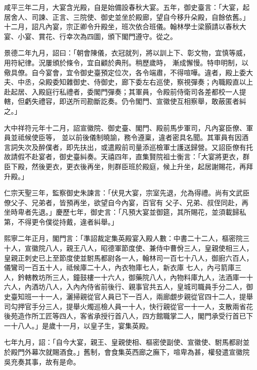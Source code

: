\begin{pinyinscope}
 咸平三年二月，大宴含光殿，自是始備設春秋大宴。五年，御史臺言：「大宴，起居舍人、司諫、正言、三院使、御史並坐於殿廊，望自今移升朵殿，自餘依舊。」十二月，詔凡內宴，宗正卿令升殿坐，班次依合班儀。翰林學士梁顥請以春秋大宴、小宴、賞花、行幸次為四圖，頒下閣門遵守。從之。



 景德二年九月，詔曰：「朝會陳儀，衣冠就列，將以訓上下、彰文物，宜慎等威，用符紀律。況屢頒於條令，宜自顧於典刑。稍歷歲時，
 漸成懈慢。特申明制，以儆具僚。自今宴會，宜令御史臺預定位次，各令端肅，不得喧嘩。違者，殿上委大夫、中丞，朵殿委知雜御史、侍御史，廊下委左右巡使，察視彈奏；內職殿直以上赴起居、入殿庭行私禮者，委閣門彈奏；其軍員，令殿前侍衛司各差都校一人提轄，但虧失禮容，即送所司勘斷訖奏。仍令閣門、宣徽使互相察舉，敢蔽匿者糾之。」



 大中祥符元年十二月，詔宣徽院、御史臺、閣門、殿前馬步軍司，凡內宴臣僚、軍員並祗候使臣等，
 並以前後儀制曉諭，務令遵稟，違者密具名聞。其軍員有因酒言詞失次及醉僕者，即先扶出，或遣殿前司量添巡檢軍士護送歸營。又詔臣僚有托故請假不赴宴者，御史臺糾奏。天禧四年，直集賢院祖士衡言：「大宴將更衣，群臣下殿，然後更衣，更衣後再坐，則群臣班於殿庭，候上升坐，起居謝賜花，再拜升殿。」



 仁宗天聖三年，監察御史朱諫言：「伏見大宴，宗室先退，允為得禮。尚有文武臣僚父子、兄弟者，皆預再坐，欲望自今內宴，百官有
 父子、兄弟、叔侄同赴，再坐時卑者先退。」慶歷七年，御史言：「凡預大宴並御筵，其所賜花，並須載歸私第，不得更令僕從持戴，違者糾舉。」



 熙寧二年正月，閣門言：「準詔裁定集英殿宴入殿人數：中書二十二人，樞密院三十人，宣徽院八人，親王八人，昭德軍節度使、兼侍中曹佾三人，皇親使相三人，皇親正刺史已上至節度使並駙馬都尉各一人，翰林司一百七十八人，御廚六百人，儀鸞司一百五十人，祗候庫二十人，內衣物庫七人，新衣庫
 七人，內弓箭庫三人，鈐轄教坊所三人，鐘鼓樓一十六人，御藥院八人，內物料庫九人，法酒庫一十六人，內酒坊八人，入內內侍省前後行、親事官共五人，皇城司職員手分二人，御史臺知班一十一人，灑掃親從官人員已下一百人，兩廊覷步親從官四十二人，提舉司勾押官手分三人，提舉火燭巡檢人員一十人，快行親從官一十一人，支散兩省花後苑造作所工匠等四人，客省承授行首八人，四方館職掌二人，閣門承受行首已下
 一十八人。」是歲十一月，以皇子生，宴集英殿。



 七年九月，詔：「自今大宴，親王、皇親使相、樞密使副使、宣徽使、駙馬都尉並於殿門外幕次就賜酒食。」舊制，會食集英西廊之廡下，喧卑為甚，權發遣宣徽院吳充奏其事，故有是命。




\end{pinyinscope}
